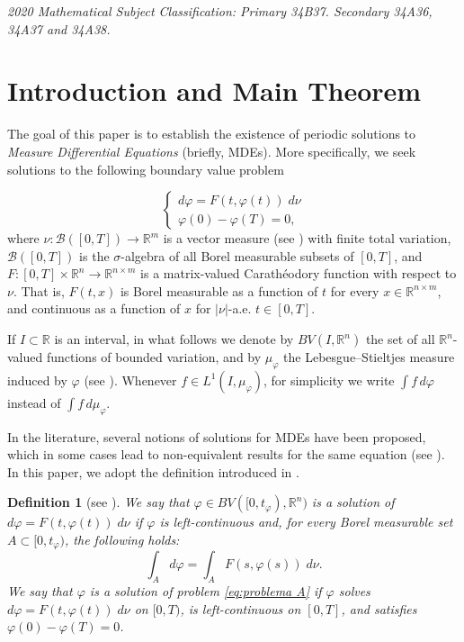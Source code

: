 \documentclass[a4paper,11pt]{amsart}
\theoremstyle{plain}
\newtheorem{defi}[thm]{Definition}
\theoremstyle{remark}
\newcommand{\rr}{\mathbb{R}}
\numberwithin{equation}{section}
\begin{document}
       \noindent\emph{2020 Mathematical Subject Classification:  Primary 34B37. Secondary  34A36, 34A37 and  34A38.}




\section{Introduction and Main Theorem}

The goal of this paper is to establish the existence of periodic solutions to \emph{Measure Differential Equations} (briefly, MDEs). More specifically, we seek solutions to the following boundary value problem

\begin{equation} \label{eq:problema A}
	\left\lbrace \begin{array}{l}
		d\varphi=F(t,\varphi(t))\;d \nu\\
		\varphi(0)-\varphi(T)=0,
	\end{array}\right.
\end{equation}
where $\nu:\mathscr{B}([0,T])\to \rr^m$ is a vector measure (see \cite{distel}) with finite total variation, $\mathscr{B}([0,T])$ is the $\sigma$-algebra of all Borel measurable subsets of $[0,T]$, and $F:[0,T]\times \rr^n\to \rr^{n\times m}$ is a matrix-valued Carathéodory function with respect to $\nu$. That is, $F(t,x)$ is Borel measurable as a function of $t$ for every $x\in \mathbb{R}^{n\times m}$, and continuous as a function of $x$ for $|\nu|$-a.e. $t\in [0,T]$.


If $I\subset\rr$ is an interval, in what follows we denote by $BV(I,\rr^n)$ the set of all $\rr^n$-valued functions of bounded variation, and by $\mu_\varphi$ the Lebesgue--Stieltjes measure induced by $\varphi$ (see \cite{StanislawSaks,EdwinHewitt,folland, Evans, Carter}). Whenever $f\in L^1(I,\mu_\varphi)$, for simplicity we write $\int f\, d\varphi$ instead of $\int f\, d\mu_\varphi$.

In the literature, several notions of solutions for MDEs have been proposed, which in some cases lead to non-equivalent results for the same equation (see \cite{S.T.Zavalishchin}). In this paper, we adopt the definition introduced in \cite{P.Mazzone}.
\begin{defi}[see \cite{P.Mazzone}]\label{def-sol}  We say that
	$\varphi \in BV([0,t_\varphi),\rr^n)$ is a solution of $d\varphi=F(t,\varphi(t))\;d \nu$ if $\varphi$ is left-continuous and, for every Borel measurable set $A\subset [0,t_\varphi)$, the following holds:
\begin{equation}\label{eq:9}
    \int_{A}d\varphi=\int_{A}F(s,\varphi(s))\; d\nu.
\end{equation}
We say that $\varphi$ is a solution of problem \eqref{eq:problema A} if $\varphi$ solves $d\varphi=F(t,\varphi(t))\;d \nu$ on $[0,T)$, is left-continuous on $[0,T]$, and satisfies $\varphi(0)-\varphi(T)=0$. 
\end{defi}
\end{document}
